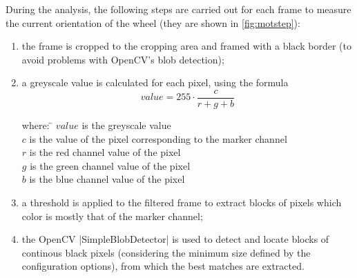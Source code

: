 \beforelist* During the analysis, the following steps are carried out for each
frame to measure the current orientation of the wheel (they are shown in
\autoref{fig:motstep}):
\begin{enumerate}[label=\alph*)]
  \item the frame is cropped to the cropping area and framed with a black border
    (to avoid problems with OpenCV's blob detection);
  \item a greyscale value is calculated for each pixel, using the formula
    \[
      value = 255\cdot\frac{c}{r + g + b}
    \]
    \begin{tabbing}
      where:  \= $value$ is the greyscale value \\
              \> $c$ is the value of the pixel corresponding to the marker
                channel \\
              \> $r$ is the red channel value of the pixel \\
              \> $g$ is the green channel value of the pixel \\
              \> $b$ is the blue channel value of the pixel
    \end{tabbing}
  \item a threshold is applied to the filtered frame to extract blocks of pixels
    which color is mostly that of the marker channel;
  \item the OpenCV \Code|SimpleBlobDetector| is used to detect and locate blocks
    of continous black pixels (considering the minimum size defined by the
    configuration options), from which the best matches are extracted.
\end{enumerate}
\afterlist*

